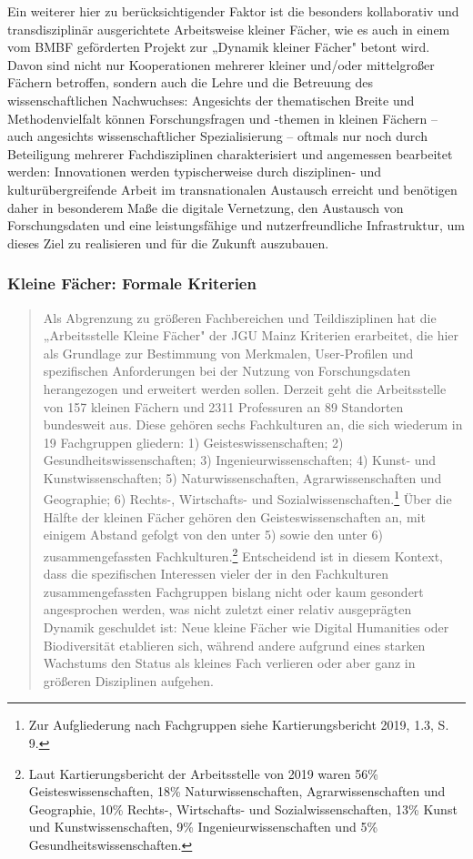 Ein weiterer hier zu berücksichtigender Faktor ist die besonders
kollaborativ und transdisziplinär ausgerichtete Arbeitsweise kleiner
Fächer, wie es auch in einem vom BMBF geförderten Projekt zur „Dynamik
kleiner Fächer" betont wird. Davon sind nicht nur Kooperationen mehrerer
kleiner und/oder mittelgroßer Fächern betroffen, sondern auch die Lehre
und die Betreuung des wissenschaftlichen Nachwuchses: Angesichts der
thematischen Breite und Methodenvielfalt können Forschungsfragen und
-themen in kleinen Fächern -- auch angesichts wissenschaftlicher
Spezialisierung -- oftmals nur noch durch Beteiligung mehrerer
Fachdisziplinen charakterisiert und angemessen bearbeitet werden:
Innovationen werden typischerweise durch disziplinen- und
kulturübergreifende Arbeit im transnationalen Austausch erreicht und
benötigen daher in besonderem Maße die digitale Vernetzung, den
Austausch von Forschungsdaten und eine leistungsfähige und
nutzerfreundliche Infrastruktur, um dieses Ziel zu realisieren und für
die Zukunft auszubauen.

\hypertarget{kleine-fuxe4cher-formale-kriterien}{%
\subsubsection{Kleine Fächer: Formale
Kriterien}\label{kleine-fuxe4cher-formale-kriterien}}

\begin{quote}
Als Abgrenzung zu größeren Fachbereichen und Teildisziplinen hat die
„Arbeitsstelle Kleine Fächer" der JGU Mainz Kriterien erarbeitet, die
hier als Grundlage zur Bestimmung von Merkmalen, User-Profilen und
spezifischen Anforderungen bei der Nutzung von Forschungsdaten
herangezogen und erweitert werden sollen. Derzeit geht die Arbeitsstelle
von 157 kleinen Fächern und 2311 Professuren an 89 Standorten bundesweit
aus. Diese gehören sechs Fachkulturen an, die sich wiederum in 19
Fachgruppen gliedern: 1) Geisteswissenschaften; 2)
Gesundheitswissenschaften; 3) Ingenieurwissenschaften; 4) Kunst- und
Kunstwissenschaften; 5) Naturwissenschaften, Agrarwissenschaften und
Geographie; 6) Rechts-, Wirtschafts- und
Sozialwissenschaften.\footnote{Zur Aufgliederung nach Fachgruppen siehe
  Kartierungsbericht 2019, 1.3, S. 9.} Über die Hälfte der kleinen
Fächer gehören den Geisteswissenschaften an, mit einigem Abstand gefolgt
von den unter 5) sowie den unter 6) zusammengefassten
Fachkulturen.\footnote{Laut Kartierungsbericht der Arbeitsstelle von
  2019 waren 56\% Geisteswissenschaften, 18\% Naturwissenschaften,
  Agrarwissenschaften und Geographie, 10\% Rechts-, Wirtschafts- und
  Sozialwissenschaften, 13\% Kunst und Kunstwissenschaften, 9\%
  Ingenieurwissenschaften und 5\% Gesundheitswissenschaften.}
Entscheidend ist in diesem Kontext, dass die spezifischen Interessen
vieler der in den Fachkulturen zusammengefassten Fachgruppen bislang
nicht oder kaum gesondert angesprochen werden, was nicht zuletzt einer
relativ ausgeprägten Dynamik geschuldet ist: Neue kleine Fächer wie
Digital Humanities oder Biodiversität etablieren sich, während andere
aufgrund eines starken Wachstums den Status als kleines Fach verlieren
oder aber ganz in größeren Disziplinen aufgehen.
\end{quote}

